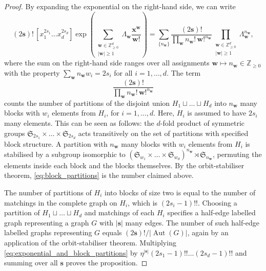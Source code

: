 \documentclass[11pt, a4paper]{article}
\numberwithin{theorem}{section}
\theoremstyle{remark}
\newcommand{\ZZ}{\mathbb{Z}}
\DeclareMathOperator{\Aut}{Aut}
\newcommand{\bb}[1]{\boldsymbol{#1}}
\newcommand{\Sym}{\mathfrak{S}}
\theoremstyle{theorem}
\begin{document}
\begin{proof}
  By expanding the exponential on the right-hand side, we can write
  \begin{equation}
    \label{eq:exponential_and_block_partitions}
    (2 \bb{s})! \, [x_1^{2s_1}\dots x_d^{2s_d}]\exp\left( \sum_{\substack{\bb{w}\in \ZZ^d_{\geq 0}\\ |\bb{w}| \geq 1}} \Lambda_{\bb{w}} \frac{\bb{x}^{\bb{w}}}{\bb{w}!} \right)
    = \sum_{\{n_{\bb{w}}\}} \frac{(2 \bb{s})!}{\prod_{\bb{w}} n_{\bb{w}}!\, \bb{w}!^{n_{\bb{w}}}} \prod_{\substack{\bb{w}\in \ZZ^d_{\geq 0}\\ |\bb{w}| \geq 1}} \Lambda_{\bb{w}}^{n_{\bb{w}}},
  \end{equation}
  where the sum on the right-hand side ranges over all assignments $\bb{w} \mapsto n_{\bb{w}} \in \ZZ_{\geq 0}$ with the property $\sum_{\bb{w}} n_{\bb{w}} w_i = 2s_i$ for all $i=1,\dots,d$. The term 
  \begin{equation}
    \label{eq:block_partitions}
    \frac{(2 \bb{s})!}{\prod_{\bb{w}} n_{\bb{w}}!\, \bb{w}!^{n_{\bb{w}}}}
  \end{equation}
  counts the number of partitions of the disjoint union $H_1 \sqcup \dots \sqcup H_d$ into $n_{\bb{w}}$ many blocks with $w_i$ elements from $H_i$, for $i=1,\dots,d$. Here, $H_i$ is assumed to have $2s_i$ many elements. This can be seen as follows: the $d$-fold product of symmetric groups $\Sym_{2s_1} \times \dots \times \Sym_{2s_d}$ acts transitively on the set of partitions with specified block structure. A partition with $n_{\bb{w}}$ many blocks with $w_i$ elements from $H_i$ is stabilised by a subgroup isomorphic to $(\Sym_{w_1} \times \dots \times \Sym_{w_d})^{n_{\bb{w}}} \rtimes \Sym_{n_{\bb{w}}}$, permuting the elements inside each block and the blocks themselves. By the orbit-stabiliser theorem, \eqref{eq:block_partitions} is the number claimed above. \par   
  The number of partitions of $H_i$ into blocks of size two is equal to the number of matchings in the complete graph on $H_i$, which is $(2s_i - 1)!!$. Choosing a partition of $H_1\sqcup\dots\sqcup H_d$ and matchings of each $H_i$ specifies a half-edge labelled graph representing a graph $G$ with $|\bb{s}|$ many edges. 
  The number of such half-edge labelled graphs representing $G$ equals $(2\bb{s})!/|\Aut(G)|$,
  again by an application of the orbit-stabiliser theorem. Multiplying \eqref{eq:exponential_and_block_partitions} by $\eta^{|\bb{s}|} (2s_1-1)!!\dots (2s_d-1)!!$ and summing over all $\bb{s}$ proves the proposition.
\end{proof}
\end{document}

